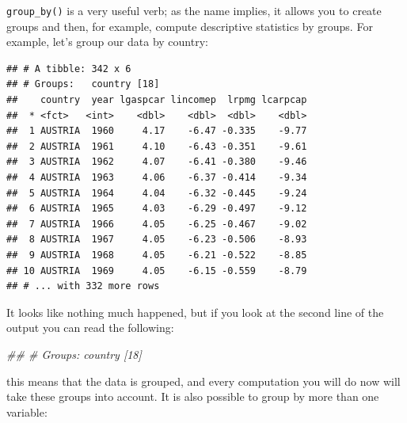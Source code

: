 \documentclass[]{gitbook}
\newenvironment{Shaded}{\begin{snugshade}}{\end{snugshade}}
\newcommand{\CommentTok}[1]{\textcolor[rgb]{0.56,0.35,0.01}{\textit{#1}}}
\newcommand{\KeywordTok}[1]{\textcolor[rgb]{0.13,0.29,0.53}{\textbf{#1}}}
\newcommand{\NormalTok}[1]{#1}
\newcommand{\OperatorTok}[1]{\textcolor[rgb]{0.81,0.36,0.00}{\textbf{#1}}}
\newcommand{\StringTok}[1]{\textcolor[rgb]{0.31,0.60,0.02}{#1}}
\theoremstyle{definition}
\theoremstyle{definition}
\theoremstyle{definition}
\theoremstyle{remark}
\begin{document}
\texttt{group\_by()} is a very useful verb; as the name implies, it
allows you to create groups and then, for example, compute descriptive
statistics by groups. For example, let's group our data by country:

\begin{Shaded}
\end{Shaded}

\begin{verbatim}
## # A tibble: 342 x 6
## # Groups:   country [18]
##    country  year lgaspcar lincomep  lrpmg lcarpcap
##  * <fct>   <int>    <dbl>    <dbl>  <dbl>    <dbl>
##  1 AUSTRIA  1960     4.17    -6.47 -0.335    -9.77
##  2 AUSTRIA  1961     4.10    -6.43 -0.351    -9.61
##  3 AUSTRIA  1962     4.07    -6.41 -0.380    -9.46
##  4 AUSTRIA  1963     4.06    -6.37 -0.414    -9.34
##  5 AUSTRIA  1964     4.04    -6.32 -0.445    -9.24
##  6 AUSTRIA  1965     4.03    -6.29 -0.497    -9.12
##  7 AUSTRIA  1966     4.05    -6.25 -0.467    -9.02
##  8 AUSTRIA  1967     4.05    -6.23 -0.506    -8.93
##  9 AUSTRIA  1968     4.05    -6.21 -0.522    -8.85
## 10 AUSTRIA  1969     4.05    -6.15 -0.559    -8.79
## # ... with 332 more rows
\end{verbatim}

It looks like nothing much happened, but if you look at the second line
of the output you can read the following:

\begin{Shaded}
\begin{Highlighting}[]
\CommentTok{## # Groups:   country [18]}
\end{Highlighting}
\end{Shaded}

this means that the data is grouped, and every computation you will do
now will take these groups into account. It is also possible to group by
more than one variable:

\begin{Shaded}
\end{Shaded}
\end{document}
